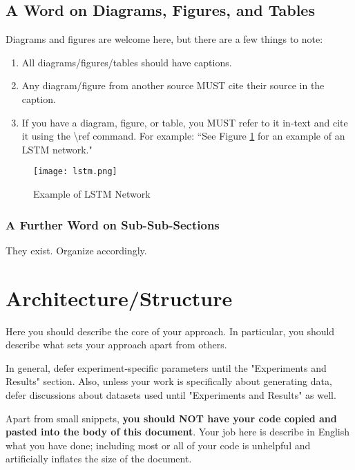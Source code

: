 \subsection{A Word on Diagrams, Figures, and Tables}
Diagrams and figures are welcome here, but there are a few things to note:
\begin{enumerate}
    \item All diagrams/figures/tables should have captions.
    \item Any diagram/figure from another source MUST cite their source in the caption.
    \item If you have a diagram, figure, or table, you MUST refer to it in-text and cite it using the \textbackslash ref command.  For example: ``See Figure \ref{LSTMExample} for an example of an LSTM network."
\end{enumerate}

\begin{figure}
\begin{center}
\texttt{[image: lstm.png]}
\end{center}
\caption{Example of LSTM Network \cite{lstmpaper}}
\label{LSTMExample}
\end{figure}

\subsubsection{A Further Word on Sub-Sub-Sections}
They exist.  Organize accordingly.

\section{Architecture/Structure}
Here you should describe the core of your approach.  In particular, you should describe what sets your approach apart from others.

In general, defer experiment-specific parameters until the "Experiments and Results" section.  Also, unless your work is specifically about generating data, defer discussions about datasets used until "Experiments and Results" as well.

Apart from small snippets, \textbf{you should NOT have your code copied and pasted into the body of this document}.  Your job here is describe in English what you have done; including most or all of your code is unhelpful and artificially inflates the size of the document. 


